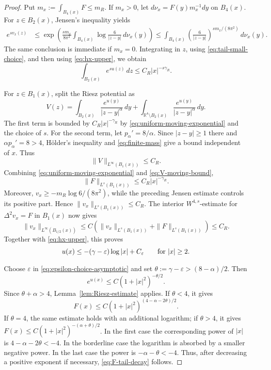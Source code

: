 \documentclass[10pt,a4paper]{amsart}
\begin{document}
\begin{proof}
Put \(m_{x}:=\int_{B_{4}(x)}F\leq m_{R}\). If \(m_x>0\), let
\(d\nu_x=F(y)m_x^{-1}dy\) on \(B_4(x)\). For \(z\in B_2(x)\), Jensen's inequality yields
\[
\begin{aligned}
e^{s v_x(z)}
&\leq
\exp\left(\frac{s m_x}{8\pi^{2}}
\int_{B_4(x)}\log\frac{6}{|z-y|}\,d\nu_x(y)\right)\leq
\int_{B_4(x)}
\left(\frac{6}{|z-y|}\right)^{s m_x/(8\pi^{2})}
\,d\nu_x(y).
\end{aligned}
\]
The same conclusion is immediate if \(m_x=0\). Integrating in \(z\), using \eqref{eq:tail-small-choice}, and then using \eqref{eq:hx-upper}, we obtain
\begin{equation}\label{eq:uniform-moving-exponential}
\int_{B_{2}(x)}e^{s u(z)}\,dz
\leq C_{R}|x|^{-s\gamma_{R}}.
\end{equation}

For \(z\in B_{1}(x)\), split the Riesz potential as
\[
V(z)=\int_{B_{2}(x)}\frac{e^{u(y)}}{|z-y|^{\alpha}}\,dy
+\int_{\mathbb R^{4}\setminus B_{2}(x)}
\frac{e^{u(y)}}{|z-y|^{\alpha}}\,dy.
\]
The first term is bounded by \(C_R|x|^{-\gamma_R}\) by
\eqref{eq:uniform-moving-exponential} and the choice of \(s\). For the second term, let \(p_{\alpha}'=8/\alpha\). Since \(|z-y|\geq1\) there and \(\alpha p_{\alpha}'=8>4\), H\"older's inequality and \eqref{eq:finite-mass} give a bound independent of \(x\). Thus
\begin{equation}\label{eq:V-moving-bound}
\|V\|_{L^{\infty}(B_{1}(x))}\leq C_{R}.
\end{equation}
Combining \eqref{eq:uniform-moving-exponential} and \eqref{eq:V-moving-bound},
\begin{equation*}
\|F\|_{L^{s}(B_{1}(x))}\leq C_{R}|x|^{-\gamma_{R}}.
\end{equation*}
Moreover, \(v_x\geq-m_R\log 6/(8\pi^{2})\), while the preceding Jensen estimate controls its positive part. Hence \(\|v_x\|_{L^{s}(B_1(x))}\leq C_R\). The interior \(W^{4,s}\)-estimate for
\(\Delta^{2}v_x=F\) in \(B_1(x)\) now gives
\[
\|v_x\|_{L^{\infty}(B_{1/2}(x))}
\leq C\left(\|v_x\|_{L^{s}(B_1(x))}
+\|F\|_{L^{s}(B_1(x))}\right)\leq C_R.
\]
Together with \eqref{eq:hx-upper}, this proves
\begin{equation*}
u(x)\leq-(\gamma-\varepsilon)\log|x|+C_{\varepsilon}
\qquad\hbox{for }|x|\geq2.
\end{equation*}

Choose \(\varepsilon\) in \eqref{eq:epsilon-choice-asymptotic} and set
\(\theta:=\gamma-\varepsilon>(8-\alpha)/2\). Then
\[
e^{u(x)}\leq C(1+|x|^{2})^{-\theta/2}.
\]
Since \(\theta+\alpha>4\), Lemma~\ref{lem:Riesz-estimate} applies. If \(\theta<4\), it gives
\[
F(x)\leq C(1+|x|^{2})^{(4-\alpha-2\theta)/2}.
\]
If \(\theta=4\), the same estimate holds with an additional logarithm; if \(\theta>4\), it gives
\(F(x)\leq C(1+|x|^{2})^{-(\alpha+\theta)/2}\). In the first case the corresponding power of \(|x|\) is
\(4-\alpha-2\theta<-4\). In the borderline case the logarithm is
absorbed by a smaller negative power. In the last case the power is
\(-\alpha-\theta<-4\). Thus, after decreasing a positive exponent if
necessary, \eqref{eq:F-tail-decay} follows.


\end{proof}
\end{document}
